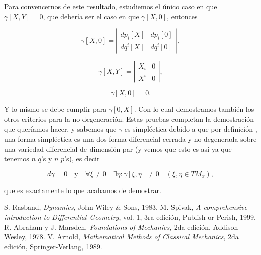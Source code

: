 \documentclass[a4paper,10pt]{article}
\numberwithin{equation}{section}
\begin{document}
\vspace{.3cm}

Para convencernos de este resultado, estudiemos el único caso en que $\gamma[X,Y] = 0$, 
que debería ser el caso en que $\gamma[X,0]$, entonces 

\begin{equation}
 \gamma[X,0] = \left|\begin{matrix}
                dp_i[X] & dp_i[0] \\
                dq^i[X] & dq^i[0]
               \end{matrix}\right|,
\end{equation}

\begin{equation}
 \gamma[X,Y] = \left|\begin{matrix}
                X_i & 0 \\
                X^i & 0
               \end{matrix}\right|,
\end{equation}

\begin{equation}
 \gamma[X,0] = 0.
\end{equation}

Y lo mismo se debe cumplir para $\gamma[0,X]$. Con lo cual demostramos también los otros 
criterios para la no degeneración. Estas pruebas completan la demostración que queríamos 
hacer, y sabemos que $\gamma$ es simpléctica debido a que por definición \cite{rasband,abraham,arnold},
una forma simpléctica es una dos-forma diferencial cerrada y no degenerada sobre 
una variedad diferencial de dimensión par (y vemos que esto es así ya que tenemos 
$n$ $q$'s y $n$ $p$'s), es decir 

\begin{equation}
 d\gamma = 0 \quad \text{y} \quad \forall \xi \ne 0 \quad \exists \eta: \gamma[\xi,\eta] \ne 0 
 \quad (\xi,\eta \in TM_x),
\end{equation}

que es exactamente lo que acabamos de demostrar.


\begin{thebibliography}{10}
S. Rasband, \emph{Dynamics}, John Wiley \& Sons, 1983.
M. Spivak, \emph{A comprehensive introduction to Differential Geometry}, vol. 1, 
3ra edición, Publish or Perish, 1999.
 R. Abraham y J. Marsden, \emph{Foundations of Mechanics}, 2da edición, Addison-Wesley,
 1978.
V. Arnold, \emph{Mathematical Methods of Classical Mechanics}, 2da edición, Springer-Verlang, 
1989.
 
\end{thebibliography}
\end{document}
